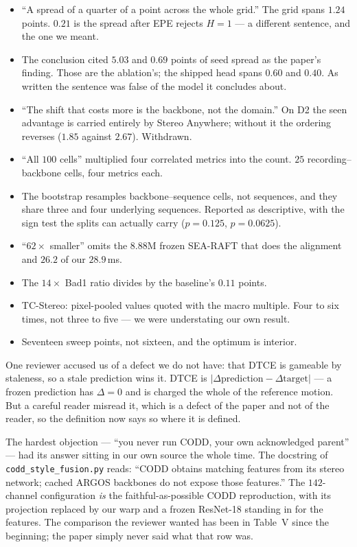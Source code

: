 \documentclass[11pt,a4paper]{article}
\begin{document}
\begin{itemize}
\item ``A spread of a quarter of a point across the whole grid.'' The grid spans
$1.24$ points. $0.21$ is the spread after EPE rejects $H{=}1$ --- a different
sentence, and the one we meant.
\item The conclusion cited $5.03$ and $0.69$ points of seed spread as the
paper's finding. Those are the ablation's; the shipped head spans $0.60$ and
$0.40$. As written the sentence was false of the model it concludes about.
\item ``The shift that costs more is the backbone, not the domain.'' On D2 the
seen advantage is carried entirely by Stereo Anywhere; without it the ordering
reverses ($1.85$ against $2.67$). Withdrawn.
\item ``All $100$ cells'' multiplied four correlated metrics into the count.
$25$ recording--backbone cells, four metrics each.
\item The bootstrap resamples backbone--sequence cells, not sequences, and they
share three and four underlying sequences. Reported as descriptive, with the
sign test the splits can actually carry ($p=0.125$, $p=0.0625$).
\item ``$62\times$ smaller'' omits the $8.88$M frozen SEA-RAFT that does the
alignment and $26.2$ of our $28.9$\,ms.
\item The $14\times$ Bad1 ratio divides by the baseline's $0.11$ points.
\item TC-Stereo: pixel-pooled values quoted with the macro multiple. Four to six
times, not three to five --- we were understating our own result.
\item Seventeen sweep points, not sixteen, and the optimum is interior.
\end{itemize}

One reviewer accused us of a defect we do not have: that DTCE is gameable by
staleness, so a stale prediction wins it. DTCE is
$|\Delta\text{prediction}-\Delta\text{target}|$ --- a frozen prediction has
$\Delta{=}0$ and is charged the whole of the reference motion. But a careful
reader misread it, which is a defect of the paper and not of the reader, so the
definition now says so where it is defined.

The hardest objection --- ``you never run CODD, your own acknowledged parent''
--- had its answer sitting in our own source the whole time. The docstring of
\texttt{codd\_style\_fusion.py} reads: ``CODD obtains matching features from its
stereo network; cached ARGOS backbones do not expose those features.'' The
$142$-channel configuration \emph{is} the faithful-as-possible CODD
reproduction, with its projection replaced by our warp and a frozen ResNet-18
standing in for the features. The comparison the reviewer wanted has been in
Table~V since the beginning; the paper simply never said what that row was.
\end{document}
